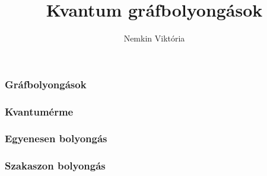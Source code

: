 \documentclass[aspectratio=169]{beamer}
\author{Nemkin Viktória}
\title{Kvantum gráfbolyongások}
\date{}
\begin{document}
\frame{\titlepage}

\begin{frame}
  \frametitle{Gráfbolyongások}
\end{frame}

\begin{frame}
  \frametitle{Kvantumérme}
\end{frame}

\begin{frame}
  \frametitle{Egyenesen bolyongás}
\end{frame}

\begin{frame}
  \frametitle{Szakaszon bolyongás}
\end{frame}
\end{document}
